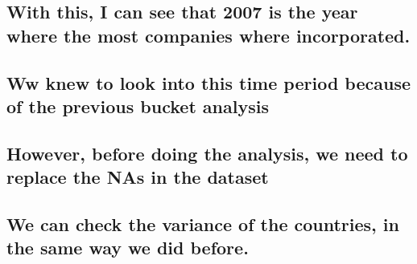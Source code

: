 \documentclass[]{article}
\begin{document}
\hypertarget{with-this-i-can-see-that-2007-is-the-year-where-the-most-companies-where-incorporated.}{%
\subsection{With this, I can see that 2007 is the year where the most
companies where
incorporated.}\label{with-this-i-can-see-that-2007-is-the-year-where-the-most-companies-where-incorporated.}}

\hypertarget{ww-knew-to-look-into-this-time-period-because-of-the-previous-bucket-analysis}{%
\subsection{Ww knew to look into this time period because of the
previous bucket
analysis}\label{ww-knew-to-look-into-this-time-period-because-of-the-previous-bucket-analysis}}

\hypertarget{however-before-doing-the-analysis-we-need-to-replace-the-nas-in-the-dataset}{%
\subsection{However, before doing the analysis, we need to replace the
NAs in the
dataset}\label{however-before-doing-the-analysis-we-need-to-replace-the-nas-in-the-dataset}}

\hypertarget{we-can-check-the-variance-of-the-countries-in-the-same-way-we-did-before.}{%
\subsection{We can check the variance of the countries, in the same way
we did
before.}\label{we-can-check-the-variance-of-the-countries-in-the-same-way-we-did-before.}}
\end{document}
